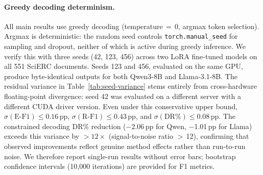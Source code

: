 \paragraph{Greedy decoding determinism.}
\label{app:greedy-determinism}
All main results use greedy decoding (temperature$\,{=}\,$0, argmax token selection).
Argmax is deterministic: the random seed controls \texttt{torch.manual\_seed} for sampling and dropout, neither of which is active during greedy inference.
We verify this with three seeds (42, 123, 456) across two LoRA fine-tuned models on all 551 SciERC documents.
Seeds 123 and 456, evaluated on the same GPU, produce byte-identical outputs for both Qwen3-8B and Llama-3.1-8B.
The residual variance in Table~\ref{tab:seed-variance} stems entirely from cross-hardware floating-point divergence: seed 42 was evaluated on a different server with a different CUDA driver version.
Even under this conservative upper bound, $\sigma(\text{E-F1}) \leq 0.16$\,pp, $\sigma(\text{R-F1}) \leq 0.43$\,pp, and $\sigma(\text{DR\%}) \leq 0.08$\,pp.
The constrained decoding DR\% reduction ($-$2.06\,pp for Qwen, $-$1.01\,pp for Llama) exceeds this variance by ${>}12\times$ (signal-to-noise ratio ${>}$\,12), confirming that observed improvements reflect genuine method effects rather than run-to-run noise.
We therefore report single-run results without error bars; bootstrap confidence intervals (10{,}000 iterations) are provided for F1 metrics.

\begin{table}[h]
\centering
\caption{Cross-seed variance for LoRA fine-tuned models on SciERC (551 documents, greedy decoding, seeds 42/123/456). Values: mean $\pm$ population $\sigma$ across three seeds. Seeds 123 and 456 produce identical outputs on the same GPU; all observed $\sigma$ reflects cross-server floating-point divergence.}
\label{tab:seed-variance}
\small
{}
\end{table}

